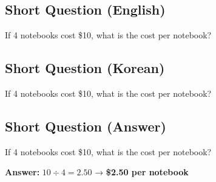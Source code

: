 \cleardoublepage
\subsection*{Short Question (English)}
If 4 notebooks cost \$10, what is the cost per notebook?


\newpage
\subsection*{Short Question (Korean)}
If 4 notebooks cost \$10, what is the cost per notebook?


\newpage
\subsection*{Short Question (Answer)}
If 4 notebooks cost \$10, what is the cost per notebook?

\textbf{Answer:} $10 \div 4 = 2.50$ → \textbf{\$2.50 per notebook}
